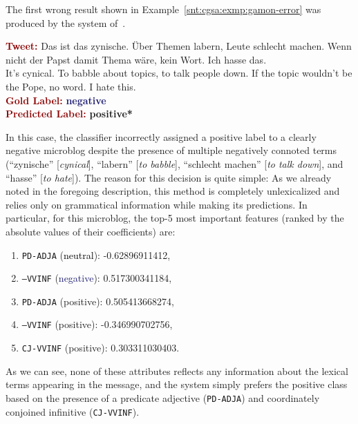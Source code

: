The first wrong result shown in
Example~\ref{snt:cgsa:exmp:gamon-error} was produced by the system
of~\citet{Gamon:04}.
\begin{example}\label{snt:cgsa:exmp:mohammad-error}
  \noindent\textup{\bfseries\textcolor{darkred}{Tweet:}} {\upshape Das ist das zynische. \"Uber Themen labern, Leute schlecht machen. Wenn nicht der Papst damit Thema w\"are, kein Wort. Ich hasse das.}\\
  \noindent It's cynical.  To babble about topics, to talk people
  down.  If the topic wouldn't be the Pope, no word. I hate
  this.\\[\exampleSep]
  \noindent\textup{\bfseries\textcolor{darkred}{Gold Label:}}\hspace*{4.3em}\textbf{%
    \upshape\textcolor{midnightblue}{negative}}\\
 \noindent\textup{\bfseries\textcolor{darkred}{Predicted Label:}}\hspace*{2em}\textbf{%
    \upshape\textcolor{green3}{positive*}}\label{snt:cgsa:exmp:gamon-error}
\end{example}
\noindent{} In this case, the classifier incorrectly assigned a
positive label to a clearly negative microblog despite the presence of
multiple negatively connoted terms (``zynische'' [\emph{cynical}],
``labern'' [\emph{to babble}], ``schlecht machen'' [\emph{to talk
    down}], and ``hasse'' [\emph{to hate}]).  The reason for this
decision is quite simple: As we already noted in the foregoing
description, this method is completely unlexicalized and relies only
on grammatical information while making its predictions.  In
particular, for this microblog, the top-5 most important features
(ranked by the absolute values of their coefficients) are:
\begin{enumerate}
\item \texttt{PD-ADJA} (\textcolor{black}{neutral}): -0.62896911412,
\item \texttt{---VVINF} (\textcolor{midnightblue}{negative}): 0.517300341184,
\item \texttt{PD-ADJA} (\textcolor{green3}{positive}): 0.505413668274,
\item \texttt{---VVINF} (\textcolor{green3}{positive}): -0.346990702756,
\item \texttt{CJ-VVINF} (\textcolor{green3}{positive}):
  0.303311030403.
\end{enumerate}
As we can see, none of these attributes reflects any information about
the lexical terms appearing in the message, and the system simply
prefers the positive class based on the presence of a predicate
adjective (\texttt{PD-ADJA}) and coordinately conjoined infinitive
(\texttt{CJ-VVINF}).

